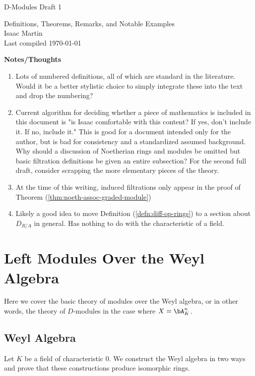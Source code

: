 


\begin{center}
	\Large
	\begin{LARGE}
		D-Modules Draft 1 \\
	\end{LARGE}
	Definitions, Theorems, Remarks, and Notable Examples \\
	Isaac Martin \\
    Last compiled \today
\end{center}
\normalsize
\vspace{-2mm}
\hru

\tableofcontents
\newpage
\noindent \textbf{Notes/Thoughts}
\begin{enumerate}
	\item Lots of numbered definitions, all of which are standard in the literature. Would it be a better stylistic choice to simply integrate these into the text and drop the numbering?
	\item Current algorithm for deciding whether a piece of mathematics is included in this document is "is Isaac comfortable with this content? If yes, don't include it. If no, include it." This is good for a document intended only for the author, but is bad for consistency and a standardized assumed background. Why should a discussion of Noetherian rings and modules be omitted but basic filtration definitions be given an entire subsection? For the second full draft, consider scrapping the more elementary pieces of the theory.
	\item At the time of this writing, induced filtrations only appear in the proof of Theorem (\ref{thm:noeth-assoc-graded-module})
	\item Likely a good idea to move Definition (\ref{defn:diff-op-rings}) to a section about $D_{R/A}$ in general. Has nothing to do with the characteristic of a field.
\end{enumerate}
\newpage

\section{Left Modules Over the Weyl Algebra}
Here we cover the basic theory of modules over the Weyl algebra, or in other words, the theory of $D$-modules in the case where $X = \bA^n_K$.

\subsection{Weyl Algebra}\label{subsec:Weyl-algebra}
Let $K$ be a field of characteristic $0$. We construct the Weyl algebra in two ways and prove that these constructions produce isomorphic rings.

